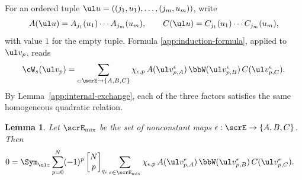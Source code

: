 \documentclass[reqno]{amsart}
\numberwithin{equation}{section}
\newtheorem*{lemma}{Lemma}
\begin{document}
For an ordered tuple $\ul u=((j_1,u_1),\ldots,(j_m,u_m))$, write
\[
A(\ul u)=A_{j_1}(u_1)\cdots A_{j_m}(u_m),\qquad
C(\ul u)=C_{j_1}(u_1)\cdots C_{j_m}(u_m),
\]
with value $1$ for the empty tuple.  Formula \eqref{app:induction-formula}, applied to $\ul v_p$, reads
\begin{equation}
	\cW_s(\ul v_p)=
	\sum_{\epsilon:\scrE\to\{A,B,C\}}
	\chi_{\epsilon,p}\,
	A(\ul v_{p,A}^\epsilon)\,
	\bbW(\ul v_{p,B}^\epsilon)\,
	C(\ul v_{p,C}^\epsilon).
	\label{app:induction-serre-form}
\end{equation}
By Lemma~\ref{app:internal-exchange}, each of the three factors satisfies the same homogeneous quadratic relation.
\begin{lemma}
Let $\scrE_{\rm mix}$ be the set of nonconstant maps $\epsilon:\scrE\to\{A,B,C\}$. Then
\begin{equation}
\begin{aligned}
0={}&\Sym_{\ul z}\sum_{p=0}^{N}(-1)^p
\begin{bmatrix}N\\p\end{bmatrix}_{q_i}
\sum_{\epsilon\in\scrE_{\rm mix}}\chi_{\epsilon,p}\,
A(\ul v_{p,A}^\epsilon)\,
\bbW(\ul v_{p,B}^\epsilon)\,
C(\ul v_{p,C}^\epsilon).
\end{aligned}
\label{app:mixed-operator-cancellation}
\end{equation}
\end{lemma}
\end{document}
